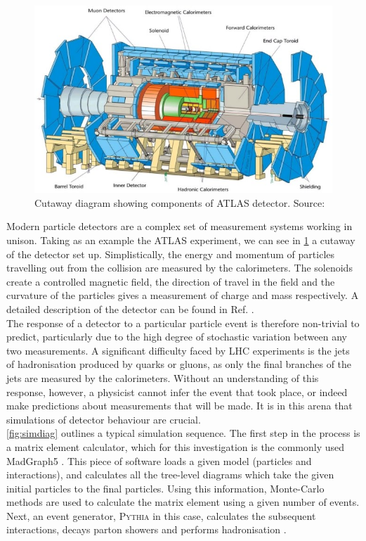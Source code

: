 \documentclass{report}
\newcommand{\pkg}[1]{\textsc{#1}}
\begin{document}
\begin{figure}[H]
	\centering
	\includegraphics[width=0.8\linewidth]{atlasdetector}
	
	\caption{Cutaway diagram showing components of ATLAS detector. Source: \cite{atlaspic}}
	\label{fig:atlaspic}
	
\end{figure}


Modern particle detectors are a complex set of measurement systems working in unison. Taking as an example the ATLAS experiment, we can see in \cref{fig:atlaspic} a cutaway of the detector set up. Simplistically, the energy and momentum of particles travelling out from the collision are measured by the calorimeters. The solenoids create a controlled magnetic field, the direction of travel in the field and the curvature of the particles gives a measurement of charge and mass respectively. A detailed description of the detector can be found in Ref. \cite{armstrong}.
\\


The response of a detector to a particular particle event is therefore non-trivial to predict, particularly due to the high degree of stochastic variation between any two measurements. A significant difficulty faced by LHC experiments is the jets of hadronisation produced by quarks or gluons, as only the final branches of the jets are measured by the calorimeters. Without an understanding of this response, however, a physicist cannot infer the event that took place, or indeed make predictions about measurements that will be made. It is in this arena that simulations of detector behaviour are crucial. \\

\cref{fig:simdiag} outlines a typical simulation sequence. The first step in the process is a matrix element calculator, which for this investigation is the commonly used MadGraph5 \cite{madgraph}. This piece of software loads a given model (particles and interactions), and calculates all the tree-level diagrams which take the given initial particles to the final particles. Using this information, Monte-Carlo methods are used to calculate the matrix element using a given number of events. Next, an event generator, \pkg{Pythia} in this case, calculates the subsequent interactions, decays parton showers and performs hadronisation \cite{Gieseke2012}.\\
\end{document}

